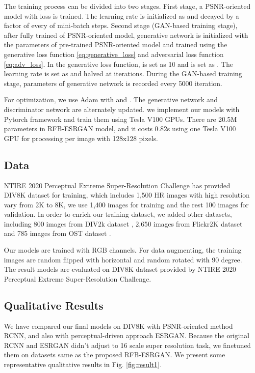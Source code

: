 \documentclass[10pt,twocolumn,letterpaper]{article}
\begin{document}
The training process can be divided into two stages. First stage, a PSNR-oriented model with  loss is trained. The learning rate is initialized as  and decayed by a factor of  every  of mini-batch steps. Second stage (GAN-based training stage), after fully trained of PSNR-oriented model, generative network is initialized with the parameters of pre-trained PSNR-oriented model and trained using the generative loss function \eqref{eq:generative_loss} and adversarial loss function \eqref{eq:adv_loss}. In the generative loss function,  is set as 10 and  is set as . The learning rate is set as  and halved at  iterations. During the GAN-based training stage, parameters of generative network is recorded every 5000 iteration. 

For optimization, we use Adam \cite{kingma2014adam} with  and . The generative network and discriminator network are alternately updated. we implement our models with Pytorch framework and train them using Tesla V100 GPUs. There are 20.5M parameters in RFB-ESRGAN model, and it costs 0.82s using one Tesla V100 GPU for processing per image with 128x128 pixels.

\subsection{Data}
NTIRE 2020 Perceptual Extreme Super-Resolution Challenge has provided DIV8K dataset \cite{gu2019div8k} for training, which includes 1,500 HR images with high resolution vary from 2K to 8K, we use 1,400 images for training and the rest 100 images for validation. In order to enrich our training dataset, we added other datasets, including 800 images from DIV2k dataset \cite{agustsson2017ntire}, 2,650 images from Flickr2K \cite{timofte2017ntire} dataset and 785 images from OST dataset \cite{wang2018recovering}.

Our models are trained with RGB channels. For data augmenting, the training images are random flipped with horizontal and random rotated with 90 degree. The result models are evaluated on DIV8K dataset provided by NTIRE 2020 Perceptual Extreme Super-Resolution Challenge.



\subsection{Qualitative Results}
We have compared our final models on DIV8K with PSNR-oriented method RCNN, and also with perceptual-driven approach ESRGAN. Because the original RCNN and ESRGAN didn't adjust to 16 scale super resolution task, we finetuned them on datasets same as the proposed RFB-ESRGAN. We present some representative qualitative results in Fig. \ref{fig:result1}. 
\end{document}
